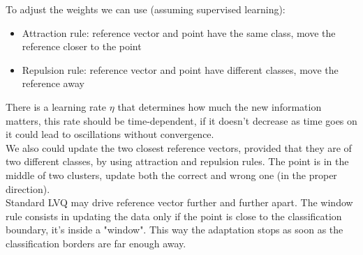 \documentclass{article}
\begin{document}
	To adjust the weights we can use (assuming supervised learning):
	\begin{itemize}
		\item Attraction rule: reference vector and point have the same class, move the reference closer to the point
		\item Repulsion rule: reference vector and point have different classes, move the reference away
	\end{itemize}
	There is a learning rate $\eta$ that determines how much the new information matters, this rate should be time-dependent, if it doesn't decrease as time goes on it could lead to oscillations without convergence.\\
	
	We also could update the two closest reference vectors, provided that they are of two different classes, by using attraction and repulsion rules. The point is in the middle of two clusters, update both the correct and wrong one (in the proper direction).\\
	
	Standard LVQ may drive reference vector further and further apart. The window rule consists in updating the data only if the point is close to the classification boundary, it's inside a "window". This way the adaptation stops as soon as the classification borders are far enough away.\\
	
	
\end{document}
